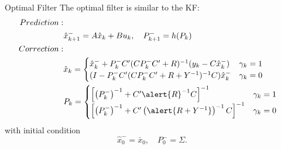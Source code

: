 \documentclass[10pt]{beamer}
\DeclareMathOperator{\1}{\textbf{1}}
\begin{document}
  \begin{frame}{Optimal Filter}
    The optimal filter is similar to the KF:
    \begin{align*}
      Prediction:&&\\
      &\hat x _{k + 1}^-  = A \hat x_{k} + Bu_k  , \quad P_{k + 1}^-  = h(P_k)\\
      Correction:&&\\
      &\hat x_{k} = \begin{cases}
	\hat x_{k}^-  + P_k^- C'(CP_k^- C'+R)^{-1} (y_k  - C \hat x _{k}^- ) & \gamma_ k = 1\\ 
	(I - P_k^-C'(CP_k^-C'+R+Y^{-1})^{-1}C)\hat x_{k}^-   & \gamma_ k = 0 
      \end{cases}\\
      &P_{k} =\begin{cases}
	\left[\left(P_k^-\right)^{-1} + C'\alert{R}^{-1}C\right]^{-1} & \gamma_k = 1\\
	\left[\left(P_k^-\right)^{-1} + C'\left( \alert{R+Y^{-1} }\right)^{-1}C\right]^{-1}  &\gamma_k = 0
      \end{cases}
    \end{align*}
    with initial condition
    \begin{displaymath}
      \hat x_{0}^-  = \bar x_0 ,\quad P_{0}^-  = \Sigma.
    \end{displaymath}
  \end{frame}
\end{document}
